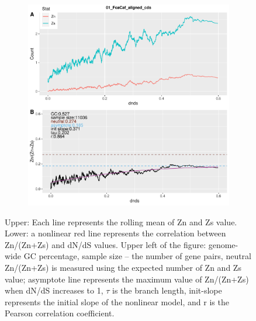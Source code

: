 \begin{figure}[H]
\begin{subfigure}[b]{0.5\textwidth}
     \includegraphics[page=9,width=1\linewidth,height=1.2\linewidth]{Figure/roll_ZnZs_max.pdf}
     \end{subfigure}
     { {Upper: Each line represents the rolling mean of Zn and Zs value. Lower: a nonlinear red line represents the correlation between Zn/(Zn+Zs) and dN/dS values. Upper left of the figure: genome-wide GC percentage, sample size -- the number of gene pairs, neutral Zn/(Zn+Zs) is measured using the expected number of Zn and Zs value; asymptote line represents the maximum value of Zn/(Zn+Zs) when dN/dS increases to 1, $\tau$ is the branch length, init-slope represents the initial slope of the nonlinear model, and r is the Pearson correlation coefficient.}
     \par}
\end{figure}


